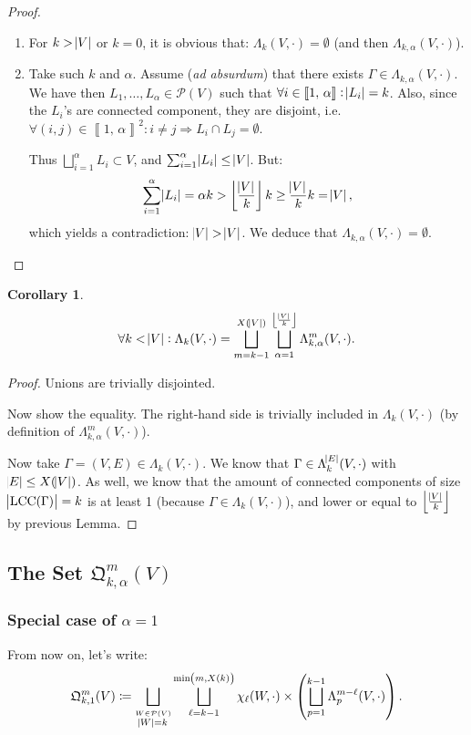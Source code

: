 \documentclass{article}
\newtheorem{corollary}[lemma]{Corollary}
\theoremstyle{definition}
\theoremstyle{remark}
\DeclareMathOperator{\LCC}{LCC}
\newcommand{\intint}[2]{\left\llbracket#1, \, #2\right\rrbracket}
\newcommand{\floor}[1]{\left\lfloor#1\right\rfloor}
\begin{document}
		\begin{proof}~
		\begin{enumerate}
			\item For $k > \abs V$ or $k=0$, it is obvious that: $\Lambda_k(V, \cdot) = \emptyset$ (and then $\Lambda_{k,\alpha}(V, \cdot)$).
			\item Take such $k$ and $\alpha$. Assume (\textit{ad absurdum}) that there exists $\Gamma \in \Lambda_{k, \alpha}(V, \cdot)$. We have then
			$L_1, \ldots, L_\alpha \in \mathcal P(V)$ such that $\forall i \in \intint 1\alpha : \abs {L_i} = k$. Also, since the $L_i$'s are connected component,
			they are disjoint, i.e. $\forall (i, j) \in \intint 1\alpha^2 : i \neq j \Rightarrow L_i \cap L_j = \emptyset$.

			Thus $\bigsqcup_{i=1}^\alpha L_i \subset V$, and $\sum_{i=1}^\alpha \abs {L_i} \leq \abs V$. But:
			\[\sum_{i=1}^\alpha\abs {L_i} = \alpha k > \floor {\frac {\abs V}k}k \geq \frac {\abs V}kk = \abs V,\]
			which yields a contradiction: $\abs V > \abs V$.
			We deduce that $\Lambda_{k,\alpha}(V, \cdot) = \emptyset$.
		\end{enumerate}
		\end{proof}

		\begin{corollary}
		\[\forall k < \abs V : \Lambda_k(V, \cdot) = \bigsqcup_{m=k-1}^{X(\abs V)}\bigsqcup_{\alpha=1}^{\floor {\frac {\abs V}k}}\Lambda_{k,\alpha}^m(V, \cdot).\]
		\end{corollary}

		\begin{proof} Unions are trivially disjointed.

		Now show the equality. The right-hand side is trivially included in $\Lambda_k(V, \cdot)$ (by definition of $\Lambda_{k,\alpha}^m(V, \cdot)$).

		Now take $\Gamma = (V, E) \in \Lambda_k(V, \cdot)$. We know that $\Gamma \in \Lambda_k^{\abs E}(V, \cdot)$ with $\abs E \leq X(\abs V)$. As well, we know that the amount
		of connected components of size $\abs {\LCC(\Gamma)} = k$ is at least 1 (because $\Gamma \in \Lambda_k(V, \cdot)$), and lower or equal to
		$\floor {\frac {\abs V}k}$ by previous Lemma.
		\end{proof}


	\subsection{The Set $\mathfrak Q_{k,\alpha}^m(V)$}
		\subsubsection{Special case of $\alpha=1$}
			From now on, let's write:
			\[\mathfrak Q_{k,1}^m(V) \coloneqq \bigsqcup_{\stackrel {W \in \mathcal P(V)}{\abs W = k}}\bigsqcup_{\ell=k-1}^{\min\left(m, X(k)\right)}
				\chi_\ell(W, \cdot) \times \left(\bigsqcup_{p=1}^{k-1}\Lambda_p^{m-\ell}(V, \cdot)\right).\]
\end{document}
